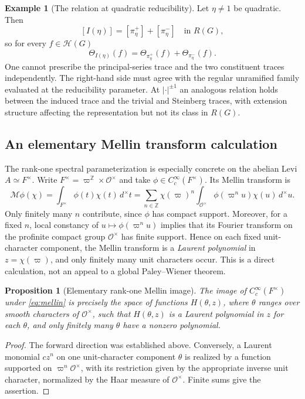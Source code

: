 \documentclass[12pt,letterpaper]{amsart}
\numberwithin{equation}{section}
\newtheorem{proposition}[theorem]{Proposition}
\theoremstyle{definition}
\newtheorem{example}[theorem]{Example}
\theoremstyle{remark}
\newcommand{\calH}{\mathcal H}
\begin{document}
\begin{example}[The relation at quadratic reducibility]\label{ex:matching}
Let $\eta\ne1$ be quadratic.  Then
\[
[I(\eta)]=[\pi_\eta^+]+[\pi_\eta^-]\quad\text{in }R(G),
\]
so for every $f\in\calH(G)$
\begin{equation}\label{eq:match}
\Theta_{I(\eta)}(f)=\Theta_{\pi_\eta^+}(f)+\Theta_{\pi_\eta^-}(f).
\end{equation}
One cannot prescribe the principal-series trace and the two constituent traces independently. The right-hand side must agree with the regular unramified family evaluated at the reducibility parameter.  At $|\cdot|^{\pm1}$ an analogous relation holds between the induced trace and the trivial and Steinberg traces, with extension structure affecting the representation but not its class in $R(G)$.
\end{example}


\subsection{An elementary Mellin transform calculation}\label{sec:mellin}
The rank-one spectral parameterization is especially concrete on the abelian Levi $A\simeq F^\times$. Write $F^\times=\varpi^{\mathbb Z}\times\mathcal O^\times$ and take $\phi\in C_c^\infty(F^\times)$.  Its Mellin transform is
\begin{equation}\label{eq:mellin}
\mathcal M\phi(\chi)=\int_{F^\times}\phi(t)\chi(t)\,d^\times t
=\sum_{n\in\mathbb Z}\chi(\varpi)^n
\int_{\mathcal O^\times}\phi(\varpi^n u)\chi(u)\,d^\times u.
\end{equation}
Only finitely many $n$ contribute, since $\phi$ has compact support. Moreover, for a fixed $n$, local constancy of $u\mapsto\phi(\varpi^n u)$ implies that its Fourier transform on the profinite compact group $\mathcal O^\times$ has finite support. Hence on each fixed unit-character component, the Mellin transform is a \emph{Laurent polynomial} in $z=\chi(\varpi)$, and only finitely many unit characters occur. This is a direct calculation, not an appeal to a global Paley--Wiener theorem.

\begin{proposition}[Elementary rank-one Mellin image]
The image of $C_c^\infty(F^\times)$ under \eqref{eq:mellin} is precisely the space of functions $H(\theta,z)$, where $\theta$ ranges over smooth characters of $\mathcal O^\times$, such that $H(\theta,z)$ is a Laurent polynomial in $z$ for each $\theta$, and only finitely many $\theta$ have a nonzero polynomial.
\end{proposition}
\begin{proof}
The forward direction was established above. Conversely, a Laurent monomial $c z^n$ on one unit-character component $\theta$ is realized by a function supported on $\varpi^n\mathcal O^\times$, with its restriction given by the appropriate inverse unit character, normalized by the Haar measure of $\mathcal O^\times$. Finite sums give the assertion.
\end{proof}
\end{document}
